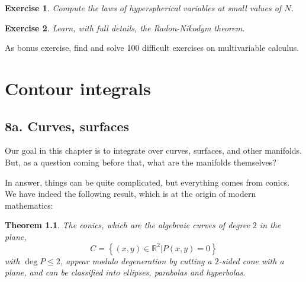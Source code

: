 \documentclass[12pt]{amsbook}
\newtheorem{theorem}{Theorem}[chapter]
\newtheorem{exercise}[theorem]{Exercise}
\begin{document}
\begin{exercise}
Compute the laws of hyperspherical variables at small values of $N$.
\end{exercise}

\begin{exercise}
Learn, with full details, the Radon-Nikodym theorem. 
\end{exercise}

As bonus exercise, find and solve 100 difficult exercises on multivariable calculus.

\chapter{Contour integrals}

\section*{8a. Curves, surfaces}

Our goal in this chapter is to integrate over curves, surfaces, and other manifolds. But, as a question coming before that, what are the manifolds themselves?

\bigskip

In answer, things can be quite complicated, but everything comes from conics. We have indeed the following result, which is at the origin of modern mathematics:


\begin{theorem}
The conics, which are the algebraic curves of degree $2$ in the plane,
$$C=\left\{(x,y)\in\mathbb R^2\Big|P(x,y)=0\right\}$$
with $\deg P\leq 2$, appear modulo degeneration by cutting a $2$-sided cone with a plane, and can be classified into ellipses, parabolas and hyperbolas.
\end{theorem}
\end{document}

